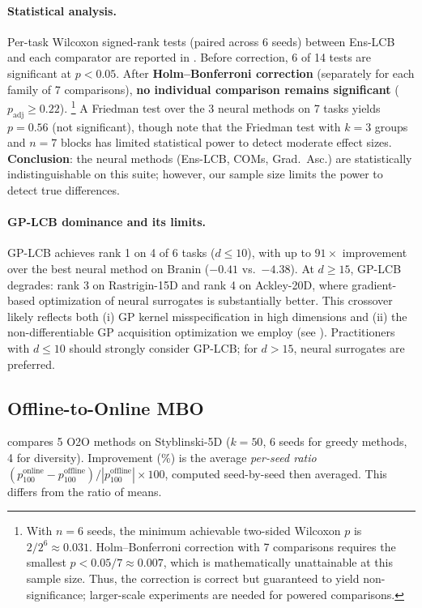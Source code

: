 \documentclass{article}
\theoremstyle{plain}
\theoremstyle{remark}
\newcommand{\method}{Ens-LCB}
\begin{document}
\paragraph{Statistical analysis.}
Per-task Wilcoxon signed-rank tests (paired across 6 seeds) between \method{} and each comparator are reported in .
Before correction, 6 of 14 tests are significant at $p < 0.05$.
After \textbf{Holm--Bonferroni correction} (separately for each family of 7 comparisons), \textbf{no individual comparison remains significant} ($p_{\mathrm{adj}} \geq 0.22$).%
\footnote{With $n{=}6$ seeds, the minimum achievable two-sided Wilcoxon $p$ is $2/2^6 \approx 0.031$. Holm--Bonferroni correction with 7 comparisons requires the smallest $p < 0.05/7 \approx 0.007$, which is mathematically unattainable at this sample size. Thus, the correction is correct but guaranteed to yield non-significance; larger-scale experiments are needed for powered comparisons.}
A Friedman test over the 3 neural methods on 7 tasks yields $p = 0.56$ (not significant), though note that the Friedman test with $k{=}3$ groups and $n{=}7$ blocks has limited statistical power to detect moderate effect sizes.
\textbf{Conclusion}: the neural methods (\method{}, COMs, Grad.\ Asc.) are statistically indistinguishable on this suite; however, our sample size limits the power to detect true differences.

\paragraph{GP-LCB dominance and its limits.}
GP-LCB achieves rank 1 on 4 of 6 tasks ($d \leq 10$), with up to $91\times$ improvement over the best neural method on Branin ($-0.41$ vs.\ $-4.38$).
At $d \geq 15$, GP-LCB degrades: rank 3 on Rastrigin-15D and rank 4 on Ackley-20D, where gradient-based optimization of neural surrogates is substantially better.
This crossover likely reflects both (i) GP kernel misspecification in high dimensions and (ii) the non-differentiable GP acquisition optimization we employ (see ).
Practitioners with $d \leq 10$ should strongly consider GP-LCB; for $d > 15$, neural surrogates are preferred.

\subsection{Offline-to-Online MBO}
\label{sec:exp_o2o}

 compares 5 O2O methods on Styblinski-5D ($k{=}50$, 6 seeds for greedy methods, 4 for diversity).
Improvement (\%) is the average \emph{per-seed ratio} $(p_{100}^{\mathrm{online}} - p_{100}^{\mathrm{offline}}) / |p_{100}^{\mathrm{offline}}| \times 100$, computed seed-by-seed then averaged.
This differs from the ratio of means.
\end{document}

